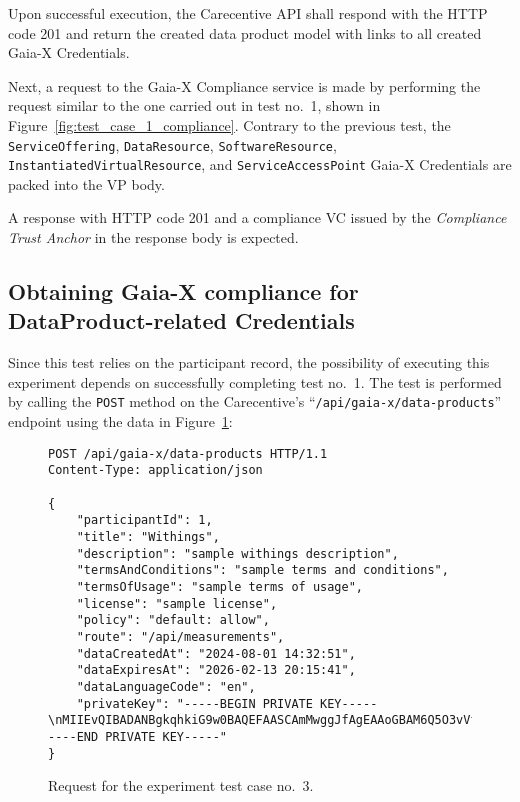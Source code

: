 Upon successful execution, the Carecentive API shall respond with the HTTP code 201 and return the created data product model with links to all created Gaia-X Credentials.

Next, a request to the Gaia-X Compliance service is made by performing the request similar to the one carried out in test no.~1, shown in Figure~\ref{fig:test_case_1_compliance}.
Contrary to the previous test, the \texttt{ServiceOffering}, \texttt{DataResource}, \texttt{SoftwareResource}, \texttt{InstantiatedVirtualResource}, and \texttt{ServiceAccessPoint} Gaia-X Credentials are packed into the VP body.

A response with HTTP code 201 and a compliance VC issued by the \textit{Compliance Trust Anchor} in the response body is expected.

\subsection[Data Product Compliance]{Obtaining Gaia-X compliance for DataProduct-related Credentials}\label{subsec:data-product-compliance}

Since this test relies on the participant record, the possibility of executing this experiment depends on successfully completing test no.~1.
The test is performed by calling the \texttt{POST} method on the Carecentive's ``\texttt{/api\-/gaia-x\-/data-products}'' endpoint using the data in Figure~\ref{fig:test_case_3}:

\begin{figure}[h]
    \centering
    \begin{verbatim}
POST /api/gaia-x/data-products HTTP/1.1
Content-Type: application/json

{
    "participantId": 1,
	"title": "Withings",
	"description": "sample withings description",
	"termsAndConditions": "sample terms and conditions",
	"termsOfUsage": "sample terms of usage",
	"license": "sample license",
	"policy": "default: allow",
	"route": "/api/measurements",
	"dataCreatedAt": "2024-08-01 14:32:51",
	"dataExpiresAt": "2026-02-13 20:15:41",
	"dataLanguageCode": "en",
	"privateKey": "-----BEGIN PRIVATE KEY-----\nMIIEvQIBADANBgkqhkiG9w0BAQEFAASCAmMwggJfAgEAAoGBAM6Q5O3vVfnxk6P7\n...\nYWw+HiFJh9XQpRUtv9PV8L8AqFFfMdsOpT6pgC+aA/WB\n-----END PRIVATE KEY-----"
}
    \end{verbatim}
    \caption{Request for the experiment test case no.~3.}\label{fig:test_case_3}
\end{figure}

